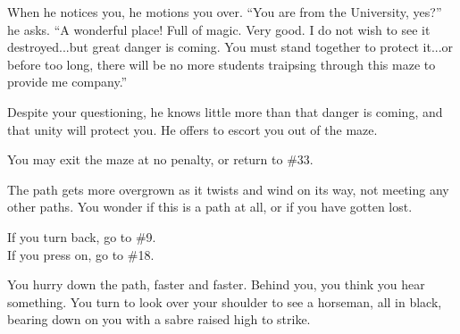\documentclass[green]{gl2018}
\begin{document}
\begin{large}
\begin{location}{25}
When he notices you, he motions you over.  ``You are from the University, yes?'' he asks.  ``A wonderful place!  Full of magic.  Very good.  I do not wish to see it destroyed...but great danger is coming.  You must stand together to protect it...or before too long, there will be no more students traipsing through this maze to provide me company.''

Despite your questioning, he knows little more than that danger is coming, and that unity will protect you.  He offers to escort you out of the maze.
\begin{fromhere}
You may exit the maze at no penalty, or return to \#33.
\end{fromhere}
\end{location}
\begin{location}{26}
The path gets more overgrown as it twists and wind on its way, not meeting any other paths. You wonder if this is a path at all, or if you have gotten lost. 
\begin{fromhere}If you turn back, go to \#9.\\ If you press on, go to \#18.\end{fromhere}
\end{location}
\begin{location}{27}
You hurry down the path,  faster and faster. Behind you, you think you hear something. You turn to look over your shoulder to see a horseman, all in black, bearing down on you with a sabre raised high to strike. 


\end{location}
\end{large}
\end{document}
